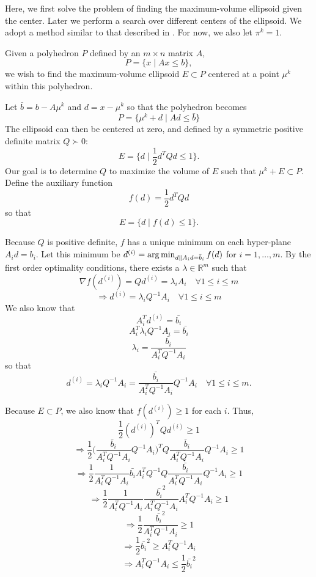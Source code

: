 Here, we first solve the problem of finding the maximum-volume ellipsoid given the center.
Later we perform a search over different centers of the ellipsoid.
We adopt a method similar to that described in \cite{Khachiyan1993}.
For now, we also let $\pi^k = 1$.

Given a polyhedron $P$ defined by an $m \times n$ matrix $A$,
\[
P = \{ x \; | \;  Ax \le b \},
\]
we wish to find the maximum-volume ellipsoid $E \subset P$ centered at a point $\mu^{k}$ within this polyhedron.

Let $\bar{b} = b - A\mu^{k}$ and $d = x - \mu^{k}$ so that the polyhedron becomes
\[
P = \{ \mu^k + d \; | \;  Ad \le \bar{b} \}
\]
The ellipsoid can then be centered at zero, and defined by a symmetric positive definite matrix $Q \succ 0$:
\[
E = \{ d \; | \; \frac 1 2 d^T Q d \le 1 \}.
\]
Our goal is to determine $Q$ to maximize the volume of $E$ such that $\mu^{k} + E \subset P$.
Define the auxiliary function 
\[
f(d) = \frac 1 2 d^T Q d
\]
so that 
\[
E = \{ d \; | \; f(d) \le 1 \}.
\]

Because $Q$ is positive definite, $f$ has a unique minimum on each hyper-plane $A_i d = b_i$.
Let this minimum be $d^{(i)} = \operatorname*{arg\,min}_{d\| A_id =\bar{b}_i} f(d)$ for $i=1,\ldots,m$.
By the first order optimality conditions, there exists a $\lambda \in \mathbb R^m$ such that
\[
\nabla f(d^{(i)}) = Q d^{(i)} = \lambda_i A_i \quad \forall 1\le i\le m
\]
\[
\Longrightarrow d^{(i)} = \lambda_i Q^{-1}A_i \quad \forall 1\le i\le m
\]
We also know that 
\[
A_i^T d^{(i)} = \bar{b_i}
\]
\[
A_i^T \lambda_i Q^{-1}A_i = \bar{b_i}
\]
\[
\lambda_i = \frac {\bar{b_i}}{A_i^T  Q^{-1}A_i}
\]
so that 
\[
d^{(i)} = \lambda_i Q^{-1}A_i = \frac {\bar{b_i}}{A_i^T  Q^{-1}A_i}  Q^{-1}A_i \quad \forall 1\le i\le m.
\]

Because $E \subset P$, we also know that $f(d^{(i)}) \ge 1$ for each $i$. Thus,
\[
\frac 1 2 (d^{(i)})^{T} Q d^{(i)} \ge 1
\]
\[
\Longrightarrow \frac 1 2 \bigg(\frac {\bar{b}_i}{A_i^T  Q^{-1}A_i}  Q^{-1}A_i\bigg)^{T} Q \frac {\bar{b}_i}{A_i^T  Q^{-1}A_i}  Q^{-1}A_i \ge 1
\]
\[
\Longrightarrow \frac 1 2 \frac {1}{A_i^T  Q^{-1}A_i}  \bar{b_i} A_i^T Q^{-1} Q \frac {\bar{b_i}}{A_i^T  Q^{-1}A_i}  Q^{-1}A_i \ge 1
\]
\[
\Longrightarrow \frac 1 2 \frac {1}{A_i^T  Q^{-1}A_i}  \frac {\bar{b_i}^2}{A_i^T  Q^{-1}A_i}  A_i^T Q^{-1}A_i \ge 1
\]
\[
\Longrightarrow \frac 1 2  \frac {\bar{b_i}^2}{A_i^T  Q^{-1}A_i} \ge 1
\]
\[
\Longrightarrow \frac 1 2 \bar{b_i}^2\ge A_i^T  Q^{-1}A_i
\]
\[
\Longrightarrow A_i^T  Q^{-1}A_i \le \frac 1 2 \bar{b_i}^2
\]

